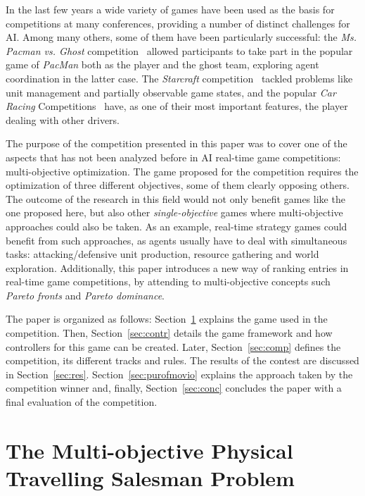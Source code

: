 \documentclass[conference]{IEEEtran}
\begin{document}
In the last few years a wide variety of games have been used as the basis for competitions at many conferences, providing a number of distinct challenges for AI. Among many others, some of them have been particularly successful: the \textit{Ms. Pacman vs. Ghost} competition~\cite{Philipp2011} allowed participants to take part in the popular game of \textit{PacMan} both as the player and the ghost team, exploring agent coordination in the latter case. The \textit{Starcraft} competition~\cite{Weber2011} tackled problems like unit management and partially observable game states, and the popular \textit{Car Racing} Competitions~\cite{Loiacono2010} have, as one of their most important features, the player dealing with other drivers.

The purpose of the competition presented in this paper was to cover one of the aspects that has not been analyzed before in AI real-time game competitions: multi-objective optimization. The game proposed for the competition requires the optimization of three different objectives, some of them clearly opposing others. The outcome of the research in this field would not only benefit games like the one proposed here, but also other \textit{single-objective} games where multi-objective approaches could also be taken. As an example, real-time strategy games could benefit from such approaches, as agents usually have to deal with simultaneous tasks: attacking/defensive unit production, resource gathering and world exploration. Additionally, this paper introduces a new way of ranking entries in real-time game competitions, by attending to multi-objective concepts such \textit{Pareto fronts} and \textit{Pareto dominance}.

The paper is organized as follows: Section~\ref{sec:moptsp} explains the game used in the competition. Then, Section~\ref{sec:contr} details the game framework and how controllers for this game can be created. Later, Section~\ref{sec:comp} defines the competition, its different tracks and rules. The results of the contest are discussed in Section~\ref{sec:res}. Section~\ref{sec:purofmovio} explains the approach taken by the competition winner and, finally, Section~\ref{sec:conc} concludes the paper with a final evaluation of the competition.

\section{The Multi-objective Physical Travelling Salesman Problem} \label{sec:moptsp}
\end{document}
